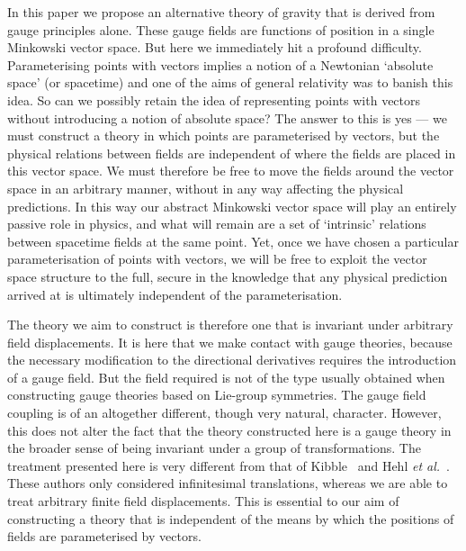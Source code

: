 \documentclass[a4paper]{article}
\numberwithin{equation}{section}
\begin{document}
In this paper we propose an alternative theory of gravity that is
derived from gauge principles alone.  These gauge fields are functions
of position in a single Minkowski vector space.  But here we
immediately hit a profound difficulty.  Parameterising points with
vectors implies a notion of a Newtonian `absolute space' (or
spacetime) and one of the aims of general relativity was to banish this idea.  
So can we possibly retain the idea of representing points with
vectors without introducing a notion of absolute space?  The answer to
this is yes --- we must construct a theory in which points are
parameterised by vectors, but the physical relations between fields
are independent of where the fields are placed in this vector space.
We must therefore be free to move the fields around the vector space
in an arbitrary manner, without in any way affecting the physical
predictions.  In this way our abstract Minkowski vector space will
play an entirely passive role in physics, and what will remain are a
set of `intrinsic' relations between spacetime fields at the same
point.  Yet, once we have chosen a particular parameterisation of
points with vectors, we will be free to exploit the vector space
structure to the full, secure in the knowledge that any physical
prediction arrived at is ultimately independent of the
parameterisation.


The theory we aim to construct is therefore one that is invariant
under arbitrary field displacements.  It is here that we make contact
with gauge theories, because the necessary modification to the
directional derivatives requires the introduction of a gauge field.
But the field required is not of the type usually obtained when
constructing gauge theories based on Lie-group symmetries.  The gauge
field coupling is of an altogether different, though very natural,
character.  However, this does not alter the fact that the theory
constructed here is a gauge theory in the broader sense of being
invariant under a group of transformations.  The treatment presented
here is very different from that of Kibble~\cite{kib61} and Hehl {\em
et al.}~\cite{heh76}.  These authors only considered infinitesimal
translations, whereas we are able to treat arbitrary finite field
displacements.  This is essential to our aim of constructing a theory
that is independent of the means by which the positions of fields are
parameterised by vectors.
\end{document}
